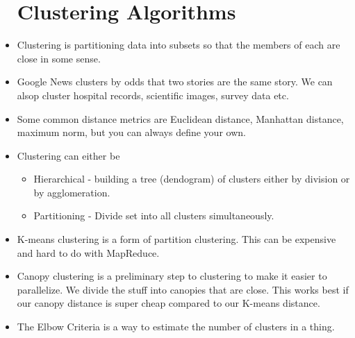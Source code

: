 \documentclass{scrartcl}
\begin{document}
\begin{itemize}
\section*{Clustering Algorithms}
\item Clustering is partitioning data into subsets so that the members of
	each are close in some sense.
\item Google News clusters by odds that two stories are the same story.
	We can alsop cluster hospital records, scientific images, survey data etc.
\item Some common distance metrics are Euclidean distance, Manhattan distance,
	maximum norm, but you can always define your own.
\item Clustering can either be 
	\begin{itemize}
	\item Hierarchical - building a tree (dendogram) of clusters either by
		division or by agglomeration.
	\item Partitioning - Divide set into all clusters simultaneously.
	\end{itemize}
\item K-means clustering is a form of partition clustering. This can be
	expensive and hard to do with MapReduce.
\item Canopy clustering is a preliminary step to clustering to make it easier
	to parallelize. We divide the stuff into canopies that are close. This 
	works best if our canopy distance is super cheap compared to our K-means
	distance.
\item The Elbow Criteria is a way to estimate the number of clusters in a thing.
\end{itemize}
\end{document}
